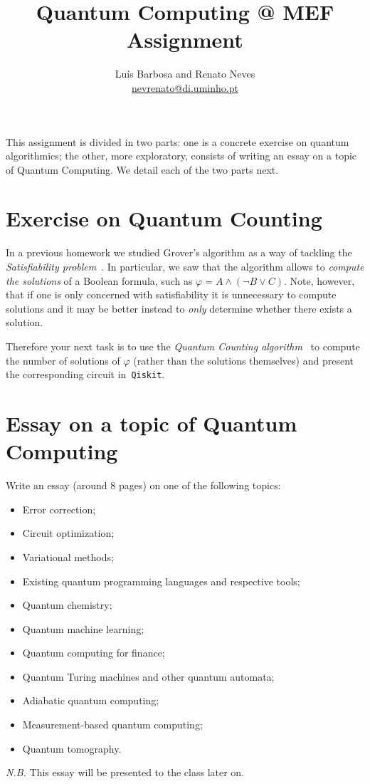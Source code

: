 \documentclass[a4paper, 11pt]{article}
\date{}
\theoremstyle{definition}
\begin{document}
\allowdisplaybreaks[2]
\title{Quantum Computing @ MEF \\ \small{Assignment}}
\author{Luís Barbosa and Renato Neves \\ \scriptsize
  \href{mailto:nevrenato@di.uminho.pt}{nevrenato@di.uminho.pt}}
\maketitle

\noindent
This assignment is divided in two parts: one is a concrete exercise on
quantum algorithmics; the other, more exploratory, consists of writing
an essay on a topic of Quantum Computing. We detail each of the two
parts next.

\section{Exercise on Quantum Counting}

\noindent
In a previous homework we studied Grover's algorithm as a way of
tackling the \emph{Satisfiability problem}~\cite{schoning13}. In
particular, we saw that the algorithm allows to \emph{compute the
  solutions} of a Boolean formula, such as
$\varphi = A \wedge (\neg B \vee C)$. Note, however, that if one is
only concerned with satisfiability it is unnecessary to compute
solutions and it may be better instead to \emph{only} determine
whether there exists a solution.

Therefore your next task is to use the \emph{Quantum Counting
  algorithm}~\cite{nielsen16} to compute the number of solutions of
$\varphi$ (rather than the solutions themselves) and present the
corresponding circuit in~\texttt{Qiskit}.


\section{Essay on a topic of Quantum Computing}

Write an essay (around 8 pages) on one of the following topics:
\begin{itemize}
\item Error correction;
\item Circuit optimization;
\item Variational methods;
\item Existing quantum programming languages and respective tools;
\item Quantum chemistry;
\item Quantum machine learning;
\item Quantum computing for finance;
\item Quantum Turing machines and other quantum automata;
\item Adiabatic quantum computing;
\item Measurement-based quantum computing;
\item Quantum tomography.  
\end{itemize}
\emph{N.B.} This essay will be presented to the class later on.
\end{document}
